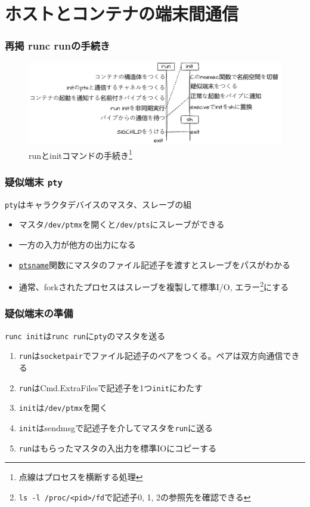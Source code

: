\documentclass[unicode, 14pt, aspectratio=169]{beamer}
\begin{document}
\section{ホストとコンテナの端末間通信}
\begin{frame}[label=overview]
  \frametitle{再掲 runc runの手続き}
  \begin{figure}
    \centering
    \includegraphics[width=14cm]{images/overview.drawio.pdf}
    \caption{runとinitコマンドの手続き\footnote{点線はプロセスを横断する処理}}
    \label{fig:re-overview}
  \end{figure}
\end{frame}
\begin{frame}
  \frametitle{疑似端末 \texttt{pty}}
  \texttt{pty}はキャラクタデバイスのマスタ、スレーブの組\supercite{pty}
  \begin{itemize}[leftmargin=0.8cm,label=$\circ$]
  \item マスタ\texttt{/dev/ptmx}を開くと\texttt{/dev/pts}にスレーブができる
  \item 一方の入力が他方の出力になる
  \item \href{https://man7.org/linux/man-pages/man3/ptsname.3.html}{\texttt{ptsname}}関数にマスタのファイル記述子を渡すとスレーブをパスがわかる
  \item 通常、forkされたプロセスはスレーブを複製して標準I/O, エラー\footnote{\scriptsize{\texttt{ls -l /proc/<pid>/fd}で記述子0, 1, 2の参照先を確認できる}}にする\supercite{advancedunix}
  \end{itemize}
\end{frame}
\begin{frame}
  \frametitle{疑似端末の準備}
  \texttt{runc init}は\texttt{runc run}に\texttt{pty}のマスタを送る
  \begin{enumerate}[leftmargin=1.2cm]
  \item \texttt{run}は\texttt{socketpair}でファイル記述子のペアをつくる。ペアは双方向通信できる
  \item \texttt{run}はCmd.ExtraFilesで記述子を1つ\texttt{init}にわたす 
  \item \texttt{init}は\texttt{/dev/ptmx}を開く
  \item \texttt{init}はsendmsgで記述子を介してマスタを\texttt{run}に送る
  \item \texttt{run}はもらったマスタの入出力を標準IOにコピーする
  \end{enumerate}
\end{frame}
\end{document}
